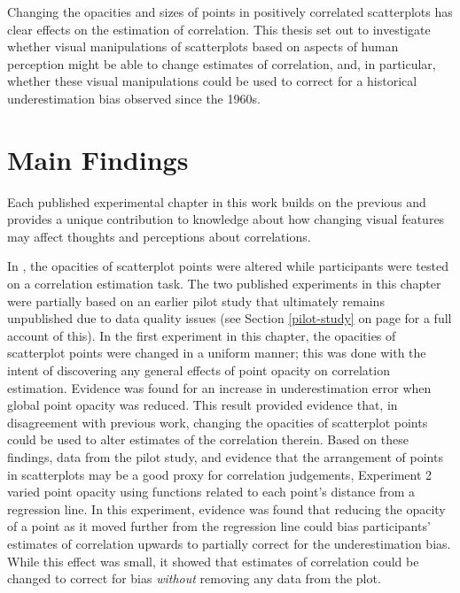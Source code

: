 \documentclass[../main.tex]{subfiles}
\begin{document}
Changing the opacities and sizes of points in positively correlated
scatterplots has clear effects on the estimation of correlation. This
thesis set out to investigate whether visual manipulations of
scatterplots based on aspects of human perception might be able to
change estimates of correlation, and, in particular, whether these
visual manipulations could be used to correct for a historical
underestimation bias observed since the 1960s.

\section{Main Findings}\label{main-findings}

Each published experimental chapter in this work builds on the previous
and provides a unique contribution to knowledge about how changing
visual features may affect thoughts and perceptions about correlations.

In , the opacities of scatterplot points
were altered while participants were tested on a correlation estimation
task. The two published experiments in this chapter were partially based
on an earlier pilot study that ultimately remains unpublished due to
data quality issues (see Section \ref{pilot-study} on page
\pageref{pilot-study} for a full account of this). In the first
experiment in this chapter, the opacities of scatterplot points were
changed in a uniform manner; this was done with the intent of
discovering any general effects of point opacity on correlation
estimation. Evidence was found for an increase in underestimation error
when global point opacity was reduced. This result provided evidence
that, in disagreement with previous work, changing the opacities of
scatterplot points could be used to alter estimates of the correlation
therein. Based on these findings, data from the pilot study, and
evidence that the arrangement of points in scatterplots may be a good
proxy for correlation judgements, Experiment 2 varied point opacity
using functions related to each point's distance from a regression line.
In this experiment, evidence was found that reducing the opacity of a
point as it moved further from the regression line could bias
participants' estimates of correlation upwards to partially correct for
the underestimation bias. While this effect was small, it showed that
estimates of correlation could be changed to correct for bias
\emph{without} removing any data from the plot.
\end{document}
